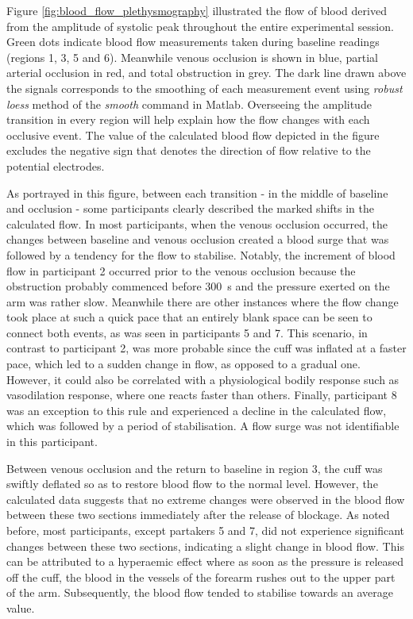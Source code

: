 Figure \ref{fig:blood_flow_plethysmography} illustrated the flow of blood derived from the amplitude of systolic peak throughout the entire experimental session. Green dots indicate blood flow measurements taken during baseline readings (regions 1, 3, 5 and 6). Meanwhile venous occlusion is shown in blue, partial arterial occlusion in red, and total obstruction in grey. The dark line drawn above the signals corresponds to the smoothing of each measurement event using \textit{robust loess} method of the \textit{smooth} command in Matlab. Overseeing the amplitude transition in every region will help explain how the flow changes with each occlusive event. The value of the calculated blood flow depicted in the figure excludes the negative sign that denotes the direction of flow relative to the potential electrodes.

As portrayed in this figure, between each transition - in the middle of baseline and occlusion - some participants clearly described the marked shifts in the calculated flow. In most participants, when the venous occlusion occurred, the changes between baseline and venous occlusion created a blood surge that was followed by a tendency for the flow to stabilise. Notably, the increment of blood flow in participant 2 occurred prior to the venous occlusion because the obstruction probably commenced before \SI{300}{\second} and the pressure exerted on the arm was rather slow. Meanwhile there are other instances where the flow change took place at such a quick pace that an entirely blank space can be seen to connect both events, as was seen in participants 5 and 7. This scenario, in contrast to participant 2, was more probable since the cuff was inflated at a faster pace, which led to a sudden change in flow, as opposed to a gradual one. However, it could also be correlated with a physiological bodily response such as vasodilation response, where one reacts faster than others. Finally, participant 8 was an exception to this rule and experienced a decline in the calculated flow, which was followed by a period of stabilisation. A flow surge was not identifiable in this participant.

Between venous occlusion and the return to baseline in region 3, the cuff was swiftly deflated so as to restore blood flow to the normal level. However, the calculated data suggests that no extreme changes were observed in the blood flow between these two sections immediately after the release of blockage. As noted before, most participants, except partakers 5 and 7, did not experience significant changes between these two sections, indicating a slight change in blood flow. This can be attributed to a hyperaemic effect where as soon as the pressure is released off the cuff, the blood in the vessels of the forearm rushes out to the upper part of the arm. Subsequently, the blood flow tended to stabilise towards an average value.

